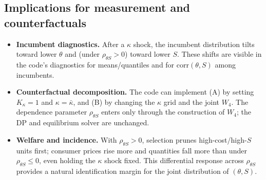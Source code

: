 \documentclass[11pt]{article}
\begin{document}
\subsection{Implications for measurement and counterfactuals}

\begin{itemize}
\item \textbf{Incumbent diagnostics.} After a $\kappa$ shock, the incumbent distribution tilts toward lower $\theta$ and (under $\rho_{\theta S}>0$) toward lower $S$. These shifts are visible in the code’s diagnostics for means/quantiles and for $\mathrm{corr}(\theta,S)$ among incumbents.

\item \textbf{Counterfactual decomposition.} The code can implement (A) by setting $K_\kappa=1$ and $\kappa=\bar\kappa$, and (B) by changing the $\kappa$ grid and the joint $W_4$. The dependence parameter $\rho_{\theta S}$ enters only through the construction of $W_4$; the DP and equilibrium solver are unchanged.

\item \textbf{Welfare and incidence.} With $\rho_{\theta S}>0$, selection prunes high-cost/high-$S$ units first; consumer prices rise more and quantities fall more than under $\rho_{\theta S}\le 0$, even holding the $\kappa$ shock fixed. This differential response across $\rho_{\theta S}$ provides a natural identification margin for the joint distribution of $(\theta,S)$.
\end{itemize}
\end{document}

